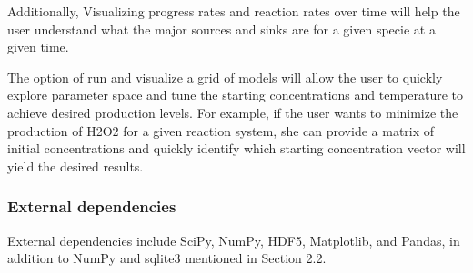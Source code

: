 \documentclass[12pt]{article}
\begin{document}
Additionally, Visualizing progress rates and reaction rates over time will help the user understand what the major sources and sinks are for a given specie at a given time. 

The option of run and visualize a grid of models will allow the user to quickly explore parameter space and tune the starting concentrations and temperature to achieve desired production levels. For example, if the user wants to minimize the production of H2O2 for a given reaction system, she can provide a matrix of initial concentrations and quickly identify which starting concentration vector will yield the desired results. 

\subsubsection{External dependencies}
External dependencies include SciPy, NumPy, HDF5, Matplotlib, and Pandas, in addition to NumPy and sqlite3 mentioned in Section 2.2. 
\end{document}
